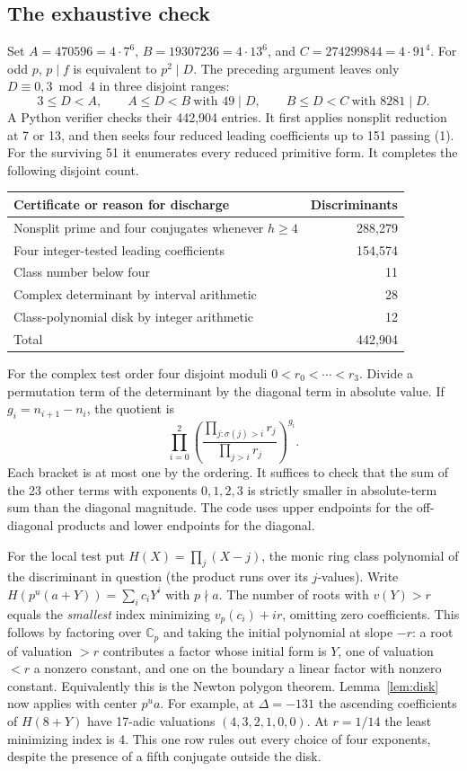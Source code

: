 \subsection{The exhaustive check}
Set $A=470596=4\cdot7^6$, $B=19307236=4\cdot13^6$, and $C=274299844=4\cdot91^4$. For odd $p$, $p\mid f$ is equivalent to $p^2\mid D$. The preceding argument leaves only $D\equiv0,3\bmod4$ in three disjoint ranges:
\[
 3\le D<A,\qquad A\le D<B\ \text{with }49\mid D,\qquad
 B\le D<C\ \text{with }8281\mid D.
\]
A Python verifier checks their 442,904 entries. It first applies nonsplit reduction at 7 or 13, and then seeks four reduced leading coefficients up to 151 passing (1). For the surviving 51 it enumerates every reduced primitive form. It completes the following disjoint count.
\begin{center}
\begin{tabular}{lr}\toprule
Certificate or reason for discharge&Discriminants\\\midrule
Nonsplit prime and four conjugates whenever $h\ge4$&288,279\\
Four integer-tested leading coefficients&154,574\\
Class number below four&11\\
Complex determinant by interval arithmetic&28\\
Class-polynomial disk by integer arithmetic&12\\\midrule
Total&442,904\\\bottomrule
\end{tabular}
\end{center}
For the complex test order four disjoint moduli $0<r_0<\cdots<r_3$. Divide a permutation term of the determinant by the diagonal term in absolute value. If $g_i=n_{i+1}-n_i$, the quotient is
\[
 \prod_{i=0}^2\left(\frac{\prod_{j:\sigma(j)>i}r_j}{\prod_{j>i}r_j}\right)^{g_i}.
\]
Each bracket is at most one by the ordering. It suffices to check that the sum of the 23 other terms with exponents $0,1,2,3$ is strictly smaller in absolute-term sum than the diagonal magnitude. The code uses upper endpoints for the off-diagonal products and lower endpoints for the diagonal.

For the local test put $H(X)=\prod_j(X-j)$, the monic ring class polynomial of the discriminant in question (the product runs over its $j$-values).
Write $H(p^u(a+Y))=\sum_i c_iY^i$ with $p\nmid a$. The number of roots with
$v(Y)>r$ equals the \emph{smallest} index minimizing $v_p(c_i)+ir$, omitting zero coefficients. This follows by factoring over $\mathbb C_p$ and taking the initial polynomial at slope $-r$: a root of valuation $>r$ contributes a factor whose initial form is $Y$, one of valuation $<r$ a nonzero constant, and one on the boundary a linear factor with nonzero constant. Equivalently this is the Newton polygon theorem. Lemma~\ref{lem:disk} now applies with center $p^u a$.
For example, at $\Delta=-131$ the ascending coefficients of $H(8+Y)$ have 17-adic valuations $(4,3,2,1,0,0)$. At $r=1/14$ the least minimizing index is 4. This one row rules out every choice of four exponents, despite the presence of a fifth conjugate outside the disk.

